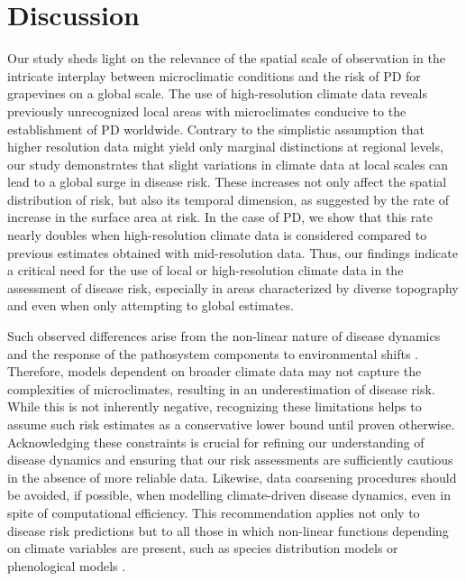 \section{Discussion}

Our study sheds light on the  relevance of the spatial scale of observation
in the intricate interplay between microclimatic conditions and the risk of PD
for grapevines on a global scale. The use of high-resolution climate data
reveals previously unrecognized local areas with microclimates conducive to the
establishment of PD worldwide. Contrary to the simplistic assumption that
higher resolution data might yield only marginal distinctions at regional
levels, our study demonstrates that slight variations in climate data at local
scales can lead to a global surge in disease risk. These increases  not only
affect the spatial distribution of risk, but also its temporal dimension, as
suggested by the rate of increase in the surface area at risk. In the case of
PD, we show that this rate nearly doubles when high-resolution climate data is
considered compared to previous estimates obtained with mid-resolution data.
Thus, our findings indicate a critical need for the use of local or
high-resolution climate data in the assessment of disease risk, especially in
areas characterized by diverse topography and even when only attempting to
global estimates.

Such observed differences arise from the non-linear nature of disease
dynamics and the response of the pathosystem components to environmental shifts
\cite{Scherm1994,Dudney2021}. Therefore, models dependent on broader
climate data may not capture the complexities of microclimates, resulting in an
underestimation of disease risk.  While this is not inherently negative,
recognizing these limitations helps to assume such risk estimates as a
conservative lower bound until proven otherwise. Acknowledging these
constraints is crucial for refining our understanding of disease dynamics and
ensuring that our risk assessments are sufficiently cautious in the absence of
more reliable data. Likewise, data coarsening procedures should be avoided, if
possible, when modelling climate-driven disease dynamics, even in spite of
computational efficiency. This recommendation applies not only to disease risk
predictions but to all those in which non-linear functions depending on climate
variables are present, such as species distribution models or phenological
models \cite{menzel2006european}.

